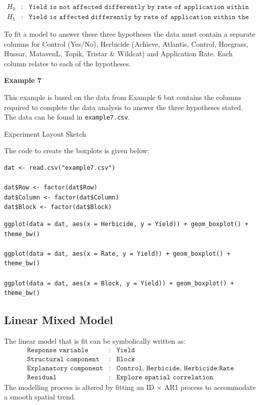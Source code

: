 \documentclass[a4paper, 10pt, fleqn, twosided]{memoir}
\begin{document}
\begin{eqnarray*}
	H_0&:& \texttt{Yield is not affected differently by rate of application within the Herbicide Treatments} \\
	H_1&:& \texttt{Yield is affected differently by rate of application within the Herbicide Treatments}
\end{eqnarray*}

To fit a model to answer these three hypotheses the data must contain a separate columns for Control (Yes/No),
Herbicide (Achieve, Atlantis, Control, Hoegrass, Hussar, MatavenL, Topik, Tristar \& Wildcat) and Application Rate.
Each column relates to each of the hypotheses.


\textbf{Example 7}

This example is based on the data from Example 6 but contains the columns required to complete the data analysis to
answer the three hypotheses stated. The data can be found in \texttt{example7.csv}.

\begin{application}{Experiment Layout Sketch}
\vspace{10cm}
\end{application}


The code to create the boxplots is given below:

\begin{tcolorbox}[title = Import and graph the data]
\begin{verbatim}
dat <- read.csv("example7.csv")

dat$Row <- factor(dat$Row)
dat$Column <- factor(dat$Column)
dat$Block <- factor(dat$Block)
\end{verbatim}
\tcblower
\begin{verbatim}
ggplot(data = dat, aes(x = Herbicide, y = Yield)) + geom_boxplot() +
theme_bw()

ggplot(data = dat, aes(x = Rate, y = Yield)) + geom_boxplot() +
theme_bw()

ggplot(data = dat, aes(x = Block, y = Yield)) + geom_boxplot() +
theme_bw()
\end{verbatim}
\end{tcolorbox}

\subsection{Linear Mixed Model}
The linear model that is fit can be symbolically written as:
\begin{eqnarray*}
	\texttt{Response variable}&:& \texttt{Yield} \\
	\texttt{Structural component}&:& \texttt{Block}\\
	\texttt{Explanatory component}&:& \texttt{Control, Herbicide, Herbicide:Rate}\\
    \texttt{Residual}&:& \texttt{Explore spatial correlation}
\end{eqnarray*}
The modelling process is altered by fitting an ID $\times$ AR1 process to
accommodate a smooth spatial trend.
\end{document}
